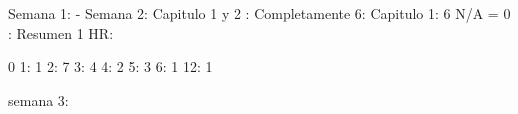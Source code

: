 Semana 1: -
Semana 2: Capitulo 1 y 2 : Completamente 6: Capitulo 1: 6 N/A = 0 : Resumen 1 HR:

0
1: 1
2: 7
3: 4
4: 2
5: 3
6: 1
12: 1


semana 3: 

